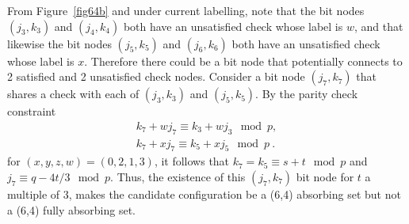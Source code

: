 From Figure~\ref{fig64b} and under current labelling, note that
the bit nodes $(j_3,k_3)$ and $(j_4,k_4)$ both have an unsatisfied
check whose label is $w$, and that likewise the bit nodes
$(j_5,k_5)$ and $(j_6,k_6)$ both have an unsatisfied check whose
label is $x$. Therefore there could be a bit node that potentially
connects to 2 satisfied and 2 unsatisfied check nodes. Consider a
bit node $(j_7,k_7)$ that shares a check with each of $(j_3,k_3)$
and $(j_5,k_5)$. By the parity check constraint
\begin{eqnarray*}
k_7 +wj_7 \equiv k_3+wj_3 \mod p,\\
k_7 +xj_7 \equiv k_5+xj_5 \mod p~.
\end{eqnarray*}
for $(x,y,z,w)=(0,2,1,3)$, it follows that $k_7=k_5 \equiv s +t
\mod p$ and $j_7 \equiv q-4t/3 \mod p$. Thus, the existence of
this $(j_7,k_7)$ bit node for $t$  a multiple of 3, makes the
candidate configuration be a (6,4) absorbing set but not a (6,4)
fully absorbing set.



